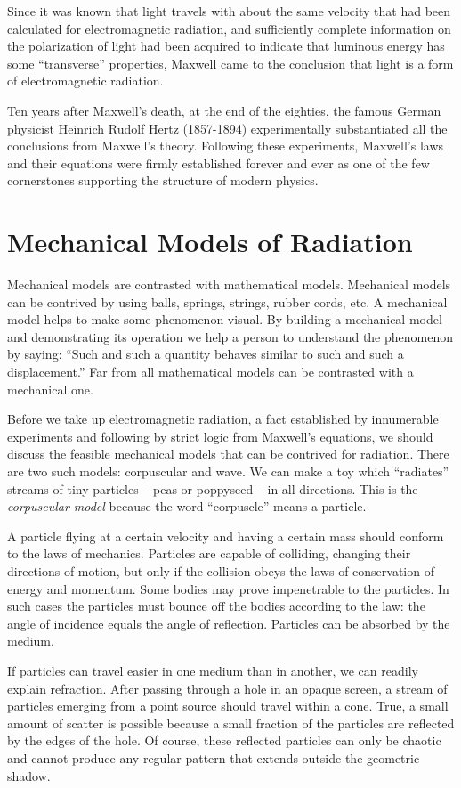 Since it was known that light travels with about the same velocity that had been calculated for electromagnetic radiation, and sufficiently complete information on the polarization of light had been acquired to indicate that luminous energy has some ``transverse'' properties, Maxwell came to the conclusion that light is a form of electromagnetic radiation.

Ten years after Maxwell's death, at the end of the eighties, the famous German physicist Heinrich Rudolf Hertz (1857-1894) experimentally substantiated all the conclusions from Maxwell's theory. Following these experiments, Maxwell's laws and their equations were firmly established forever and ever as one of the few cornerstones supporting the structure of modern physics.

\section{Mechanical Models of Radiation}
Mechanical models are contrasted with mathematical models. Mechanical models can be contrived by using balls, springs, strings, rubber cords, etc. A mechanical model helps to make some phenomenon visual. By building a mechanical model and demonstrating its operation we help a person to understand the phenomenon by saying: ``Such and such a quantity behaves similar to such and such a displacement.'' Far from all mathematical models can be contrasted with a mechanical one.

Before we take up electromagnetic radiation, a fact established by innumerable experiments and following by strict logic from Maxwell's equations, we should discuss the feasible mechanical models that can be contrived for radiation.
There are two such models: corpuscular and wave. We can make a toy which ``radiates'' streams of tiny particles -- peas or poppyseed -- in all directions. This is the \emph{corpuscular model} because the word ``corpuscle'' means a particle.

A particle flying at a certain velocity and having a certain mass should conform to the laws of mechanics. Particles are capable of colliding, changing their directions of motion, but only if the collision obeys the laws of conservation of energy and momentum. Some bodies may prove impenetrable to the particles. In such cases the particles must bounce off the bodies according to the law: the angle of incidence equals the angle of reflection. Particles can be absorbed by the medium. 

If particles can travel easier in one medium than in another, we can readily explain refraction. After passing through a hole in an opaque screen, a stream of particles emerging from a point source should travel within a cone. True, a small amount of scatter is possible because a small fraction of the particles are reflected by the edges of the hole. Of course, these reflected particles can only be chaotic and cannot produce any regular pattern that extends outside the geometric shadow.


